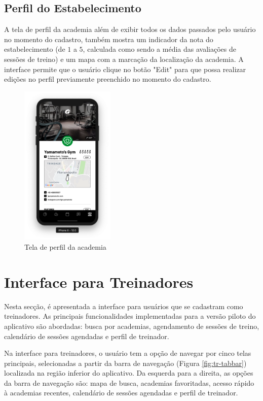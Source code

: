 \subsection{Perfil do Estabelecimento}
A tela de perfil da academia além de exibir todos os dados passados pelo usuário no momento do cadastro, também mostra um indicador da nota do estabelecimento (de $1$ a $5$, calculada como sendo a média das avaliações de sessões de treino) e um mapa com a marcação da localização da academia. A interface permite que o usuário clique no botão "Edit" para que possa realizar edições no perfil previamente preenchido no momento do cadastro.

\begin{figure}[H]
    \centering
    \includegraphics[width=0.4\textwidth]{pfc/figuras/gym-profile.png}
    \caption{Tela de perfil da academia}
    \label{fig:gym-profile}
\end{figure}

\section{Interface para Treinadores}
Nesta secção, é apresentada a interface para usuários que se cadastram como treinadores. As principais funcionalidades implementadas para a versão piloto do aplicativo são abordadas: busca por academias, agendamento de sessões de treino, calendário de sessões agendadas e perfil de treinador.  

Na interface para treinadores, o usuário tem a opção de navegar por cinco telas principais, selecionadas a partir da barra de navegação (Figura \ref{fig:tr-tabbar}) localizada na região inferior do aplicativo. Da esquerda para a direita, as opções da barra de navegação são: mapa de busca, academias favoritadas, acesso rápido à academias recentes, calendário de sessões agendadas e perfil de treinador.


